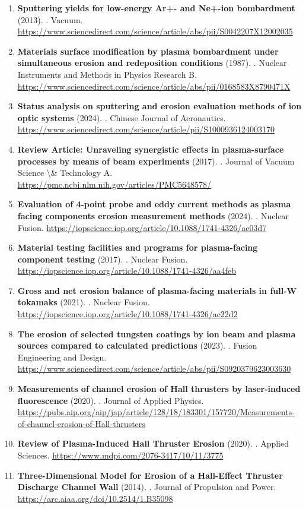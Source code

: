 \documentclass[11pt,a4paper]{article}
\begin{document}
\begin{enumerate}[leftmargin=1.4em]
\item \textbf{Sputtering yields for low-energy Ar+- and Ne+-ion bombardment} (2013). . Vacuum. \url{https://www.sciencedirect.com/science/article/abs/pii/S0042207X12002035}
\item \textbf{Materials surface modification by plasma bombardment under simultaneous erosion and redeposition conditions} (1987). . Nuclear Instruments and Methods in Physics Research B. \url{https://www.sciencedirect.com/science/article/abs/pii/0168583X8790471X}
\item \textbf{Status analysis on sputtering and erosion evaluation methods of ion optic systems} (2024). . Chinese Journal of Aeronautics. \url{https://www.sciencedirect.com/science/article/pii/S1000936124003170}
\item \textbf{Review Article: Unraveling synergistic effects in plasma-surface processes by means of beam experiments} (2017). . Journal of Vacuum Science \textbackslash{}\& Technology A. \url{https://pmc.ncbi.nlm.nih.gov/articles/PMC5648578/}
\item \textbf{Evaluation of 4-point probe and eddy current methods as plasma facing components erosion measurement methods} (2024). . Nuclear Fusion. \url{https://iopscience.iop.org/article/10.1088/1741-4326/ae03d7}
\item \textbf{Material testing facilities and programs for plasma-facing component testing} (2017). . Nuclear Fusion. \url{https://iopscience.iop.org/article/10.1088/1741-4326/aa4feb}
\item \textbf{Gross and net erosion balance of plasma-facing materials in full-W tokamaks} (2021). . Nuclear Fusion. \url{https://iopscience.iop.org/article/10.1088/1741-4326/ac22d2}
\item \textbf{The erosion of selected tungsten coatings by ion beam and plasma sources compared to calculated predictions} (2023). . Fusion Engineering and Design. \url{https://www.sciencedirect.com/science/article/abs/pii/S0920379623003630}
\item \textbf{Measurements of channel erosion of Hall thrusters by laser-induced fluorescence} (2020). . Journal of Applied Physics. \url{https://pubs.aip.org/aip/jap/article/128/18/183301/157720/Measurements-of-channel-erosion-of-Hall-thrusters}
\item \textbf{Review of Plasma-Induced Hall Thruster Erosion} (2020). . Applied Sciences. \url{https://www.mdpi.com/2076-3417/10/11/3775}
\item \textbf{Three-Dimensional Model for Erosion of a Hall-Effect Thruster Discharge Channel Wall} (2014). . Journal of Propulsion and Power. \url{https://arc.aiaa.org/doi/10.2514/1.B35098}

\end{enumerate}
\end{document}
